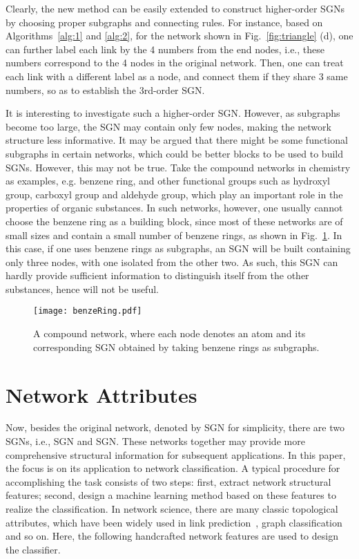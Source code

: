 \documentclass[10pt,journal,compsoc]{IEEEtran}
\begin{document}
Clearly, the new method can be easily extended to construct higher-order SGNs by choosing proper subgraphs and connecting rules. For instance, based on Algorithms~\ref{alg:1} and \ref{alg:2}, for the network shown in Fig.~\ref{fig:triangle} (d), one can further label each link by the 4 numbers from the end nodes, i.e., these numbers correspond to the 4 nodes in the original network. Then, one can treat each link with a different label as a node, and connect them if they share 3 same numbers, so as to establish the 3rd-order SGN.

It is interesting to investigate such a higher-order SGN. However, as subgraphs become too large, the SGN may contain only few nodes, making the network structure less informative. It may be argued that there might be some functional subgraphs in certain networks, which could be better blocks to be used to build SGNs. However, this may not be true. Take the compound networks in chemistry as examples, e.g. benzene ring, and other functional groups such as hydroxyl group, carboxyl group and aldehyde group, which play an important role in the properties of organic substances. In such networks, however, one usually cannot choose the benzene ring as a building block, since most of these networks are of small sizes and contain a small number of benzene rings, as shown in Fig.~\ref{fig:ben}. In this case, if one uses benzene rings as subgraphs, an SGN will be built containing only three nodes, with one isolated from the other two. As such, this SGN can hardly provide sufficient information to distinguish itself from the other substances, hence will not be useful.

\begin{figure}[!t]
	\centering
	\texttt{[image: benzeRing.pdf]}
	\caption{A compound network, where each node denotes an atom and its corresponding SGN obtained by taking benzene rings as subgraphs.}
	\label{fig:ben}
\end{figure}

\section{Network Attributes}\label{sec:NA}
Now, besides the original network, denoted by SGN for simplicity, there are two SGNs, i.e., SGN and SGN. These networks together may provide more comprehensive structural information for subsequent applications. In this paper, the focus is on its application to network classification. A typical procedure for accomplishing the task consists of two steps: first, extract network structural features; second, design a machine learning method based on these features to realize the classification. In network science, there are many classic topological attributes, which have been widely used in link prediction~\cite{wang2015link}, graph classification~\cite{li2011graph} and so on. Here, the following handcrafted network features are used to design the classifier.
\end{document}
